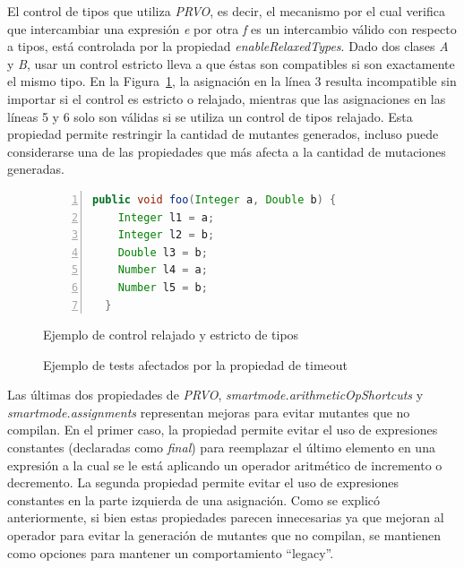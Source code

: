 El control de tipos que utiliza \emph{PRVO}, es decir, el mecanismo por el cual verifica que intercambiar una expresi\'on \emph{e} por otra \emph{f} es un intercambio v\'alido con respecto a tipos, est\'a controlada por la propiedad \emph{enableRelaxedTypes}. Dado dos clases \emph{A} y \emph{B}, usar un control estricto lleva a que \'estas son compatibles si son exactamente el mismo tipo. En la Figura~\ref{figures.examples.operators.prvo.relaxedVsStrict}, la asignaci\'on en la l\'inea 3 resulta incompatible sin importar si el control es estricto o relajado, mientras que las asignaciones en las l\'ineas 5 y 6 solo son v\'alidas si se utiliza un control de tipos relajado. Esta propiedad permite restringir la cantidad de mutantes generados, incluso puede considerarse una de las propiedades que m\'as afecta a la cantidad de mutaciones generadas.

\begin{figure}
	\begin{lstlisting}[frame=single, numbers=left, mathescape=true,language=Java,basicstyle={},framexleftmargin=.073\textwidth,xleftmargin=.085\textwidth,xrightmargin=0.012\textwidth]
  public void foo(Integer a, Double b) {
    Integer l1 = a;
    Integer l2 = b;
    Double l3 = b;
    Number l4 = a;
    Number l5 = b;
  }
	\end{lstlisting}
	\caption{Ejemplo de control relajado y estricto de tipos}
	\label{figures.examples.operators.prvo.relaxedVsStrict}
\end{figure}

\begin{figure}
	
	\caption{Ejemplo de tests afectados por la propiedad de timeout}
	\label{figures.examples.confFile.testTimeout}
\end{figure}

Las \'ultimas dos propiedades de \emph{PRVO}, \emph{smartmode.arithmeticOpShortcuts} y \emph{smartmode.assignments} representan mejoras para evitar mutantes que no compilan. En el primer caso, la propiedad permite evitar el uso de expresiones constantes (declaradas como \emph{final}) para reemplazar el \'ultimo elemento en una expresi\'on a la cual se le est\'a aplicando un operador aritm\'etico de incremento o decremento. La segunda propiedad permite evitar el uso de expresiones constantes en la parte izquierda de una asignaci\'on. Como se explic\'o anteriormente, si bien estas propiedades parecen innecesarias ya que mejoran al operador para evitar la generaci\'on de mutantes que no compilan, se mantienen como opciones para mantener un comportamiento ``legacy''.

